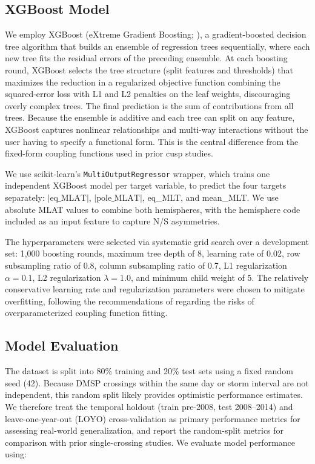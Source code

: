 \documentclass[draft]{agujournal2019}
\let\citet\citeA
\begin{document}
\subsection{XGBoost Model}

We employ XGBoost (eXtreme Gradient Boosting; \citet{chen2016xgboost}), a gradient-boosted decision tree algorithm that builds an ensemble of regression trees sequentially, where each new tree fits the residual errors of the preceding ensemble. At each boosting round, XGBoost selects the tree structure (split features and thresholds) that maximizes the reduction in a regularized objective function combining the squared-error loss with L1 and L2 penalties on the leaf weights, discouraging overly complex trees. The final prediction is the sum of contributions from all trees. Because the ensemble is additive and each tree can split on any feature, XGBoost captures nonlinear relationships and multi-way interactions without the user having to specify a functional form. This is the central difference from the fixed-form coupling functions used in prior cusp studies.

We use scikit-learn's \texttt{MultiOutputRegressor} wrapper, which trains one independent XGBoost model per target variable, to predict the four targets separately: $|\text{eq\_MLAT}|$, $|\text{pole\_MLAT}|$, eq\_MLT, and mean\_MLT. We use absolute MLAT values to combine both hemispheres, with the hemisphere code included as an input feature to capture N/S asymmetries.

The hyperparameters were selected via systematic grid search over a development set: 1,000 boosting rounds, maximum tree depth of 8, learning rate of 0.02, row subsampling ratio of 0.8, column subsampling ratio of 0.7, L1 regularization $\alpha = 0.1$, L2 regularization $\lambda = 1.0$, and minimum child weight of 5. The relatively conservative learning rate and regularization parameters were chosen to mitigate overfitting, following the recommendations of \citet{lockwood2022pitfalls} regarding the risks of overparameterized coupling function fitting.

\subsection{Model Evaluation}

The dataset is split into 80\% training and 20\% test sets using a fixed random seed (42). Because DMSP crossings within the same day or storm interval are not independent, this random split likely provides optimistic performance estimates. We therefore treat the temporal holdout (train pre-2008, test 2008--2014) and leave-one-year-out (LOYO) cross-validation as primary performance metrics for assessing real-world generalization, and report the random-split metrics for comparison with prior single-crossing studies. We evaluate model performance using:
\end{document}
